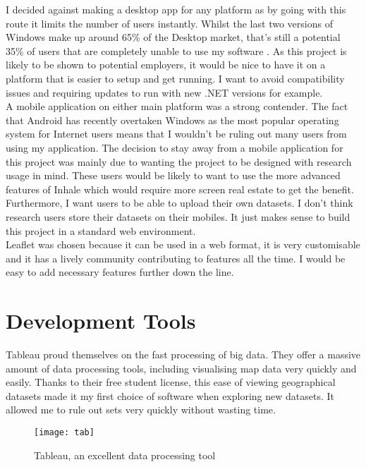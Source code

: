 I decided against making a desktop app for any platform as by going with this route it limits the number of users instantly. Whilst the last two versions of Windows make up around 65\% of the Desktop market, that's still a potential 35\% of users that are completely unable to use my software \cite{windows}. As this project is likely to be shown to potential employers, it would be nice to have it on a platform that is easier to setup and get running. I want to avoid compatibility issues and requiring updates to run with new .NET versions for example.\\

A mobile application on either main platform was a strong contender. The fact that Android has recently overtaken Windows as the most popular operating system for Internet users \cite{android} means that I wouldn't be ruling out many users from using my application. The decision to stay away from a mobile application for this project was mainly due to wanting the project to be designed with research usage in mind. These users would be likely to want to use the more advanced features of Inhale which would require more screen real estate to get the benefit. Furthermore, I want users to be able to upload their own datasets. I don't think research users store their datasets on their mobiles. It just makes sense to build this project in a standard web environment.\\

Leaflet was chosen because it can be used in a web format, it is very customisable and it has a lively community contributing to features all the time. I would be easy to add necessary features further down the line.

\section{Development Tools}

Tableau proud themselves on the fast processing of big data. They offer a massive amount of data processing tools, including visualising map data very quickly and easily. Thanks to their free student license, this ease of viewing geographical datasets made it my first choice of software when exploring new datasets. It allowed me to rule out sets very quickly without wasting time.\\

\begin{figure}[H]
\begin{center}
\texttt{[image: tab]}
\label{fig:tabf}
\caption{Tableau, an excellent data processing tool}
\end{center}
\end{figure}

